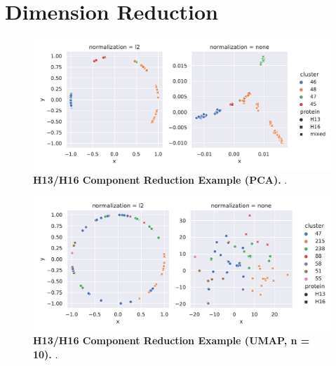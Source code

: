 \section{Dimension Reduction} \label{sec:Dimension_Reduction}

\blindtext

\begin{figure}[!hbt]
    \centering
    \includegraphics[width=\dimexpr\textwidth-2\fboxsep-2\fboxrule,fbox]{PCA/Difference_Segment_4_H_PCA.pdf}
    \caption[H13/H16 Component Reduction Example (\Acrshort{PCA})]{\textbf{H13/H16 Component Reduction Example (\Acrshort{PCA}).} .}
    \label{fig:Reduction_Example_PCA}
\end{figure}

\begin{figure}[!hbt]
    \centering
    \includegraphics[width=\dimexpr\textwidth-2\fboxsep-2\fboxrule,fbox]{UMAP/Difference_Segment_4_H_UMAP_Neighbors_10.pdf}
    \caption[H13/H16 Component Reduction Example (\Acrshort{UMAP}, n = 10)]{\textbf{H13/H16 Component Reduction Example (\Acrshort{UMAP}, n = 10).} .}
    \label{fig:Reduction_Example_UMAP_10}
\end{figure}

